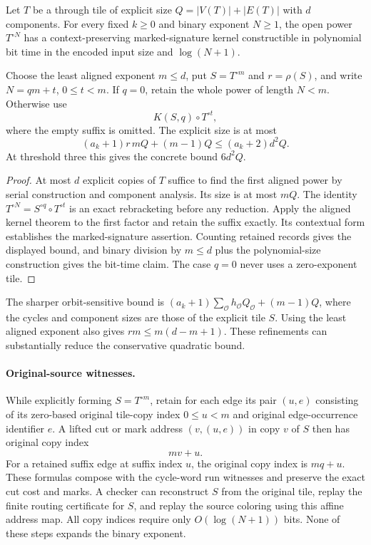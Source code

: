 \begin{corollary}
\label{cor:through-kernel}
Let $T$ be a through tile of explicit size
$Q=|V(T)|+|E(T)|$ with $d$ components.  For every fixed $k\geq0$ and
binary exponent $N\geq1$, the open power $T^{\circ N}$ has a
context-preserving marked-signature kernel constructible in polynomial bit
time in the encoded input size and $\log(N+1)$.

Choose the least aligned exponent $m\leq d$, put $S=T^{\circ m}$ and
$r=\rho(S)$, and write $N=qm+t$, $0\leq t<m$.  If $q=0$, retain the
whole power of length $N<m$.  Otherwise use
\[
 K(S,q)\circ T^{\circ t},
\]
where the empty suffix is omitted.  The explicit size is at most
\[
 (a_k+1)r\,mQ+(m-1)Q
 \leq (a_k+2)d^2Q.
\]
At threshold three this gives the concrete bound $6d^2Q$.
\end{corollary}

\begin{proof}
At most $d$ explicit copies of $T$ suffice to find the first aligned power
by serial construction and component analysis.  Its size is at most $mQ$.
The identity $T^{\circ N}=S^{\circ q}\circ T^{\circ t}$ is an exact
rebracketing before any reduction.  Apply the aligned kernel theorem to the
first factor and retain the suffix exactly.  Its contextual form establishes
the marked-signature assertion.  Counting retained records gives the displayed
bound, and binary division by $m\leq d$ plus the polynomial-size construction
gives the bit-time claim.  The case $q=0$ never uses a zero-exponent tile.
\end{proof}

The sharper orbit-sensitive bound is
$ (a_k+1)\sum_{\mathcal O} h_{\mathcal O}Q_{\mathcal O}+(m-1)Q$,
where the cycles and component sizes are those of the explicit tile $S$.
Using the least aligned exponent also gives $rm\leq m(d-m+1)$.
These refinements can substantially reduce the conservative quadratic bound.

\paragraph{Original-source witnesses.}
While explicitly forming $S=T^{\circ m}$, retain for each edge its pair
$(u,e)$ consisting of its zero-based original tile-copy index $0\leq u<m$
and original edge-occurrence identifier $e$.  A lifted cut or mark address
$(v,(u,e))$ in copy $v$ of $S$ then has original copy index
\[
 mv+u.
\]
For a retained suffix edge at suffix index $u$, the original copy index is
$mq+u$.  These formulas compose with the cycle-word run witnesses and
preserve the exact cut cost and marks.  A checker can reconstruct $S$ from
the original tile, replay the finite routing certificate for $S$, and replay
the source coloring using this affine address map.  All copy indices require
only $O(\log(N+1))$ bits.  None of these steps expands the binary exponent.

